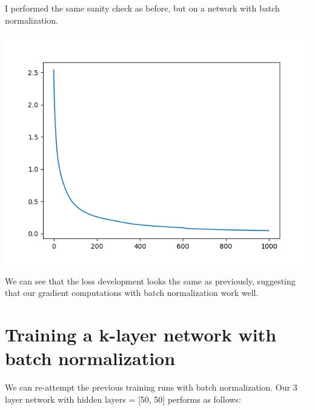 \documentclass[11pt,a4paper]{article}
\begin{document}
I performed the same sanity check as before, but on a network with batch normalization.

\includegraphics[width=\textwidth]{sanity_check_batch_norm.png}

We can see that the loss development looks the same as previously, suggesting that our gradient computations with batch normalization work well.

\section{Training a k-layer network with batch normalization}

We can re-attempt the previous training runs with batch normalization. Our 3 layer network with hidden layers = [50, 50] performs as follows:
\end{document}
